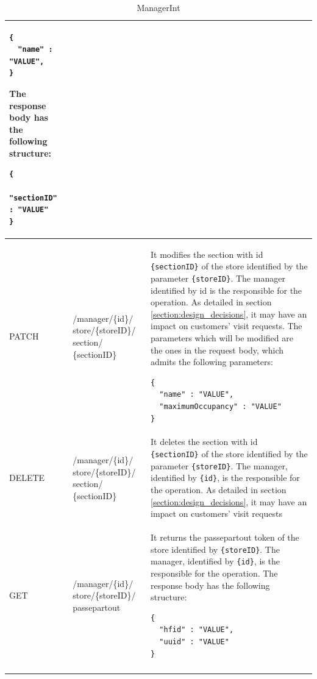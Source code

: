 \documentclass[a4paper,oneside,11pt]{book}
\begin{document}
\begin{longtable}[c] { |>{\centering\arraybackslash}P{0.11\textwidth}|>{\centering\arraybackslash\ttfamily}H{0.23\textwidth}|H{0.50\textwidth}| }
        \begin{lstlisting}[language=jsonDD]
{
  "name" : "VALUE",
}
        \end{lstlisting}
        The response body has the following structure:
        \begin{lstlisting}[language=jsonDD]
{
  "sectionID" : "VALUE"
}
        \end{lstlisting} \\ \hline
        PATCH & /manager/\{id\}/ store/\{storeID\}/ section/ \{sectionID\} & It modifies the section with id \texttt{\{sectionID\}} of the store identified by the parameter \texttt{\{storeID\}}. The manager identified by {id} is the responsible for the operation. As detailed in section \ref{section:design_decisions}, it may have an impact on customers’ visit requests. The parameters which will be modified are the ones in the request body, which admits the following parameters:
        \begin{lstlisting}[language=jsonDD]
{
  "name" : "VALUE",
  "maximumOccupancy" : "VALUE"
}
        \end{lstlisting} \\ \hline
        DELETE & /manager/\{id\}/ store/\{storeID\}/ section/ \{sectionID\} & It deletes the section with id \texttt{\{sectionID\}} of the store identified by the parameter \texttt{\{storeID\}}. The manager, identified by \texttt{\{id\}}, is the responsible for the operation. As detailed in section \ref{section:design_decisions}, it may have an impact on customers’ visit requests
        \\ \hline
        GET & /manager/\{id\}/ store/\{storeID\}/ passepartout & It returns the passepartout token of the store identified by \texttt{\{storeID\}}. The manager, identified by \texttt{\{id\}}, is the responsible for the operation. The response body has the following structure:
        \begin{lstlisting}[language=jsonDD]
{
  "hfid" : "VALUE",
  "uuid" : "VALUE"
}
        \end{lstlisting} \\ \hline
        \caption{ManagerInt}
        \label{table:manager_int}
    \end{longtable}
    
    \newpage
\end{document}
